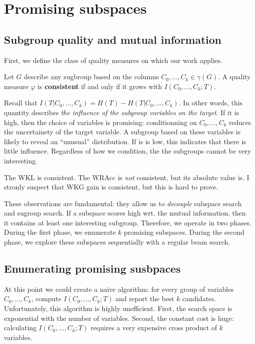 \section{Promising subspaces}

\subsection{Subgroup quality and mutual information}
First, we define the class of quality measures on which our work applies.
\begin{definition}
    Let $G$ describe any sugbroup based on the columns $C_0, \ldots, C_k \in
    \gamma(G)$.  A quality measure $\varphi$ is \textbf{consistent} if and only if it grows
    with $I(C_0, \ldots, C_k; T)$.  
\end{definition}

Recall that $I(T | C_0, \ldots, C_k) = H(T) - H(T | C_0, \ldots,C_k)$. In other
words, this quantity describes \emph{the influence of the subgroup variables on
the target}. If it is high, then the choice of variables is promising:
conditionning on $C_0, \ldots,C_k$ reduces the uncertainety of the target
variable.  A subgroup based on these variables is likely to reveal an
``unusual'' distribution. If is is low, this indicates that there is little
influence. Regardless of how we condition, the the subgroups cannot be very
interesting.

\begin{lemma}
    The WKL is consistent. The WRAcc is \emph{not} consistent, but its absolute value
    is. I stronly suspect that WKG gain is consistent, but this is hard to
    prove.
\end{lemma}

These observations are fundamental: they allow us to \emph{decouple} subspace search and
sugroup search. If a subspace scores high wrt. the mutual information, then it
contains at least one interesting subgroup. Therefore, we operate in two
phases. During the first phase, we enumerate $k$ promising subspaces. During the
second phase, we explore these subspaces sequentially with a regular beam
search.

\subsection{Enumerating promising susbpaces}

At this point we could create a naive algorithm: for every group of variables
$C_0, \ldots,C_k$, compute $I(C_0, \ldots, C_k; T)$ and report the best $k$
candidates.
Unfortunately, this algorithm is highly unefficient. First, the search space is
exponential with the number of variables. Second, the constant cost is huge:
calculating $I(C_0, \ldots, C_k; T)$ requires a very expensive cross product of
$k$ variables.

